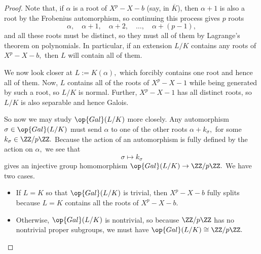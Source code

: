 \documentclass[../notes.tex]{subfiles}
\begin{document}
\begin{proof}
	Note that, if $\alpha$ is a root of $X^p-X-b$ (say, in $\overline K$), then $\alpha+1$ is also a root by the Frobenius automorphism, so continuing this process gives $p$ roots
	\[\alpha,\quad\alpha+1,\quad\alpha+2,\quad\ldots,\quad\alpha+(p-1),\]
	and all these roots must be distinct, so they must all of them by Lagrange's theorem on polynomials. In particular, if an extension $L/K$ contains any roots of $X^p-X-b,$ then $L$ will contain all of them.

	We now look closer at $L:=K(\alpha),$ which forcibly contains one root and hence all of them. Now, $L$ contains all of the roots of $X^p-X-1$ while being generated by such a root, so $L/K$ is normal. Further, $X^p-X-1$ has all distinct roots, so $L/K$ is also separable and hence Galois.

	So now we may study $\op{Gal}(L/K)$ more closely. Any automorphism $\sigma\in\op{Gal}(L/K)$ must send $\alpha$ to one of the other roots $\alpha+k_\sigma,$ for some $k_\sigma\in\ZZ/p\ZZ.$ Because the action of an automorphism is fully defined by the action on $\alpha,$ we see that
	\[\sigma\mapsto k_\sigma\]
	gives an injective group homomorphism $\op{Gal}(L/K)\to\ZZ/p\ZZ.$ We have two cases.
	\begin{itemize}
		\item If $L=K$ so that $\op{Gal}(L/K)$ is trivial, then $X^p-X-b$ fully splits because $L=K$ contains all the roots of $X^p-X-b.$
		\item Otherwise, $\op{Gal}(L/K)$ is nontrivial, so because $\ZZ/p\ZZ$ has no nontrivial proper subgroups, we must have $\op{Gal}(L/K)\cong\ZZ/p\ZZ.$
		\qedhere
	\end{itemize}
\end{proof}
\end{document}
